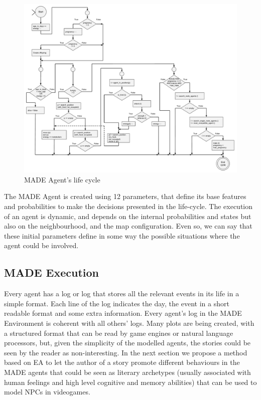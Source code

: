 \documentclass[runningheads]{llncs}
\begin{document}
\begin{figure}
\begin{center}
\includegraphics[scale=0.32]{img/life_cycle.pdf}
\caption{MADE Agent's life cycle}
\label{fig:lifecycle}
\end{center}
\end{figure}




The MADE Agent is created using 12 parameters, that define its base features and probabilities to make the decisions presented in the life-cycle. The execution of an agent is dynamic, and depends on the internal probabilities and states but also on the neighbourhood, and the map configuration. Even so, we can say that these initial parameters define in some way the possible situations where the agent could be involved.


\subsection{MADE Execution}

Every agent has a log or log that stores all the relevant events in its life in a simple format. Each line of the log indicates the day, the event in a short readable format and some extra information. Every agent's log in the MADE Environment is coherent with all others' logs. Many plots are being created, with a structured format that can be read by game engines or natural language processors, but, given the simplicity of the modelled agents, the stories could be seen by the reader as non-interesting. In the next section we propose a method based on EA to let the author of a story promote different behaviours in the MADE agents that could be seen as literary archetypes (usually associated with human feelings and high level cognitive and memory abilities) that can be used to model NPCs in videogames. 
\end{document}
